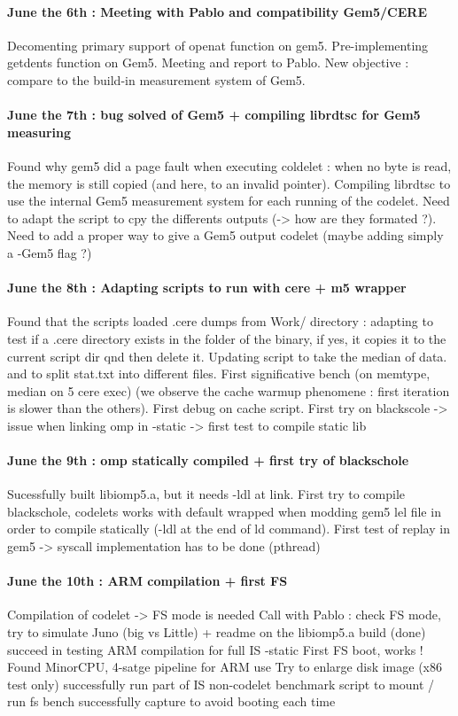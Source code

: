 \documentclass{article}
\begin{document}
\paragraph*{June the 6th : Meeting with Pablo and compatibility Gem5/CERE}
Decomenting primary support of openat function on gem5. Pre-implementing getdents function on Gem5. Meeting and report to Pablo. New objective : compare to the build-in measurement system of Gem5.

\paragraph*{June the 7th : bug solved of Gem5 + compiling librdtsc for Gem5 measuring}
Found why gem5 did a page fault when executing coldelet : when no byte is read, the memory is still copied (and here, to an invalid pointer).
Compiling librdtsc to use the internal Gem5 measurement system for each running of the codelet. Need to adapt the script to cpy the differents outputs (-> how are they formated ?).
Need to add a proper way to give a Gem5 output codelet (maybe adding simply a -Gem5 flag ?)

\paragraph*{June the 8th : Adapting scripts to run with cere + m5 wrapper}
Found that the scripts loaded .cere dumps from Work/ directory : adapting to test if a .cere directory exists in the folder of the binary, if yes, it copies it to the current script dir qnd then delete it. Updating script to take the median of data. and to split stat.txt into different files.
First significative bench (on memtype, median on 5 cere exec) (we observe the cache warmup phenomene : first iteration is slower than the others).
First debug on cache script.
First try on blackscole -> issue when linking omp in -static -> first test to compile static lib

\paragraph*{June the 9th : omp statically compiled + first try of blackschole}
Sucessfully built libiomp5.a, but it needs -ldl at link. 
First try to compile blackschole, codelets works with default wrapped when modding gem5 lel file in order to compile statically (-ldl at the end of ld command). 
First test of replay in gem5 -> syscall implementation has to be done (pthread)

\paragraph{June the 10th : ARM compilation + first FS}
Compilation of codelet -> FS mode is needed
Call with Pablo : check FS mode, try to simulate Juno (big vs Little) + readme on the libiomp5.a build (done)
succeed in testing ARM compilation for full IS -static
First FS boot, works !
Found MinorCPU, 4-satge pipeline for ARM use
Try to enlarge disk image (x86 test only)
successfully run part of IS non-codelet benchmark
script to mount / run fs bench
successfully capture to avoid booting each time
\end{document}
